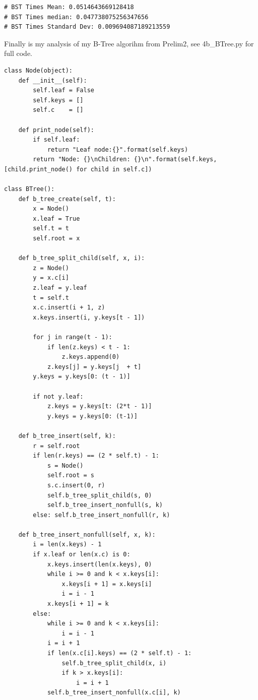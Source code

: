 \documentclass{article}
\begin{document}
\begin{enumerate}
\begin{enumerate}
\begin{lstlisting}
# BST Times Mean: 0.0514643669128418
# BST Times median: 0.047738075256347656
# BST Times Standard Dev: 0.009694087189213559
    \end{lstlisting}

    Finally is my analysis of my B-Tree algorihm from Prelim2, see 4b\_BTree.py for full code.

    \begin{lstlisting}
class Node(object):
    def __init__(self):
        self.leaf = False
        self.keys = []
        self.c    = []
        
    def print_node(self):
        if self.leaf:
            return "Leaf node:{}".format(self.keys)
        return "Node: {}\nChildren: {}\n".format(self.keys, [child.print_node() for child in self.c])

class BTree():
    def b_tree_create(self, t):
        x = Node()
        x.leaf = True
        self.t = t
        self.root = x
        
    def b_tree_split_child(self, x, i):
        z = Node()
        y = x.c[i]
        z.leaf = y.leaf
        t = self.t
        x.c.insert(i + 1, z)        
        x.keys.insert(i, y.keys[t - 1])  
        
        for j in range(t - 1):
            if len(z.keys) < t - 1:
                z.keys.append(0)
            z.keys[j] = y.keys[j  + t]
        y.keys = y.keys[0: (t - 1)]
        
        if not y.leaf:
            z.keys = y.keys[t: (2*t - 1)]
            y.keys = y.keys[0: (t-1)]

    def b_tree_insert(self, k):
        r = self.root
        if len(r.keys) == (2 * self.t) - 1:
            s = Node()
            self.root = s
            s.c.insert(0, r)
            self.b_tree_split_child(s, 0)  
            self.b_tree_insert_nonfull(s, k)
        else: self.b_tree_insert_nonfull(r, k)
    
    def b_tree_insert_nonfull(self, x, k):
        i = len(x.keys) - 1
        if x.leaf or len(x.c) is 0:
            x.keys.insert(len(x.keys), 0)
            while i >= 0 and k < x.keys[i]:
                x.keys[i + 1] = x.keys[i]
                i = i - 1
            x.keys[i + 1] = k
        else: 
            while i >= 0 and k < x.keys[i]:
                i = i - 1            
            i = i + 1
            if len(x.c[i].keys) == (2 * self.t) - 1:
                self.b_tree_split_child(x, i)
                if k > x.keys[i]:
                    i = i + 1
            self.b_tree_insert_nonfull(x.c[i], k) 
    

\end{lstlisting}
\end{enumerate}
\end{enumerate}
\end{document}
